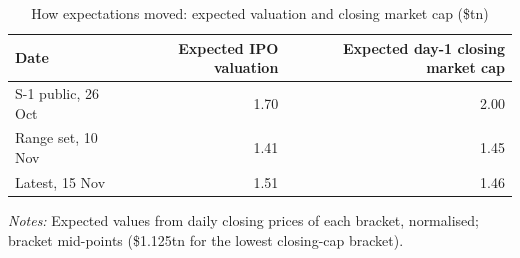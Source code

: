 \begin{table}[!htbp]\centering\footnotesize
\caption{How expectations moved: expected valuation and closing market cap (\$tn)}\label{tab:pm3}

\begin{threeparttable}
\begin{tabular}{lrr}
\toprule
Date & Expected IPO valuation & Expected day-1 closing market cap \\
\midrule
S-1 public, 26 Oct & 1.70 & 2.00 \\
Range set, 10 Nov & 1.41 & 1.45 \\
Latest, 15 Nov & 1.51 & 1.46 \\
\bottomrule
\end{tabular}
\begin{tablenotes}[flushleft]\footnotesize
\item \textit{Notes:} Expected values from daily closing prices of each bracket, normalised; bracket mid-points (\$1.125tn for the lowest closing-cap bracket).
\end{tablenotes}
\end{threeparttable}

\end{table}
